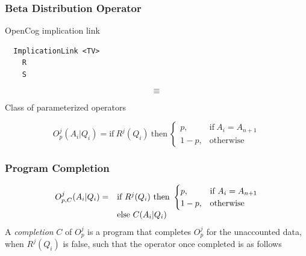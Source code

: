 \documentclass{beamer}
\begin{document}
\begin{frame}
\begin{columns}
\end{columns}





\end{frame}

\begin{frame}[fragile]
  \frametitle{Beta Distribution Operator}

OpenCog implication link
{\small
\begin{verbatim}
  ImplicationLink <TV>
    R
    S
\end{verbatim}
}

$$
\equiv
$$

Class of parameterized operators

  $$
  O^j_p(A_i|Q_i) = \text{if}\ R^j(Q_i)\ \text{then}\
  \begin{cases}
    p, & \text{if}\ A_i = A_{n+1}\\
    1-p, & \text{otherwise}
  \end{cases}
  $$
\end{frame}

\begin{frame}
  \frametitle{Program Completion}
  $$
  \begin{array}{@{}ll@{}}
    O^j_{p, C}(A_i|Q_i) = &
                            \text{if}\ R^j(Q_i)\ \text{then}\
                            \begin{cases}
                              p, & \text{if}\ A_i = A_{n+1} \\
                              1-p, & \text{otherwise}
                            \end{cases}\\
                          & \text{else}\ C(A_i|Q_i)
  \end{array}
  $$
  A \emph{completion} $C$ of $O^j_p$ is a program that completes
  $O^j_p$ for the unaccounted data, when $R^j(Q_i)$ is false, such
  that the operator once completed is as follows
\end{frame}
\end{document}
